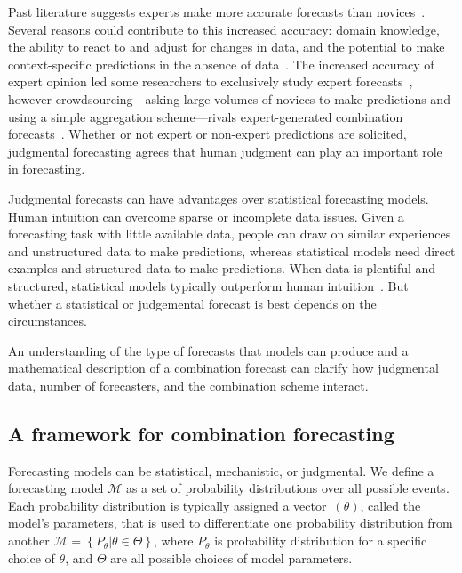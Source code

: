 \documentclass[preprint,authoryear]{elsarticle}
\def\l{\left}
\def\r{\right}
\begin{document}
Past literature suggests experts make more accurate forecasts than novices~\citep{armstrong2001combining,armstrong1983relative,lawrence2006judgmental,spence1997moderating,alexander1995refining,french2011aggregating,clemen1999combining}.
Several reasons could contribute to this increased accuracy: domain knowledge, the ability to react to and adjust for changes in data, and the potential to make context-specific predictions in the absence of data~\citep{armstrong1983relative,lawrence2006judgmental,spence1997moderating,alexander1995refining}.
The increased accuracy of expert opinion led some researchers to exclusively study expert forecasts~\citep{armstrong2001combining,french2011aggregating,genre2013combining},
however crowdsourcing---asking large volumes of novices to make predictions and using a simple aggregation scheme---rivals expert-generated combination forecasts~\citep{howe2006rise,lintott2008galaxy,prill2011crowdsourcing}.
Whether or not expert or non-expert predictions are solicited, judgmental forecasting agrees that human judgment can play an important role in forecasting.

Judgmental forecasts can have advantages over statistical forecasting models. 
Human intuition can overcome sparse or incomplete data issues.
Given a forecasting task with little available data, people can draw on similar experiences and unstructured data to make predictions, whereas statistical models need direct examples and structured data to make predictions.
When data is plentiful and structured, statistical models typically outperform human intuition~\citep{meehl1954clinical,kleinmuntz1990we,yaniv1993judgmental}.
But whether a statistical or judgemental forecast is best depends on the circumstances. 

An understanding of the type of forecasts that models can produce and a mathematical description of a combination forecast can clarify how judgmental data, number of forecasters, and the combination scheme interact.

\subsection{A framework for combination forecasting}

Forecasting models can be statistical, mechanistic, or judgmental. 
We define a forecasting model $\mathcal{M}$ as a set of probability distributions over all possible events.
Each probability distribution is typically assigned a vector~$(\theta)$, called the model's parameters, that is used to differentiate one probability distribution from another
$\mathcal{M} = \l\{ P_{\theta} | \theta \in \Theta \r\}$,
where $P_{\theta}$ is probability distribution for a specific choice of $\theta$, and $\Theta$ are all possible choices of model parameters.
\end{document}
